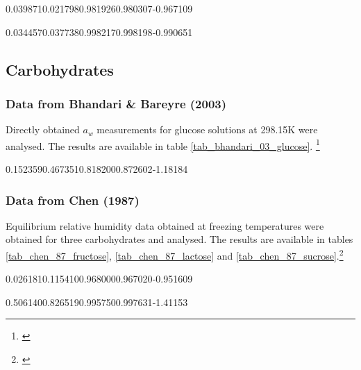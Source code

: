 %
	{0.039871}{0.021798}{0.981926}{0.980307}{-0.967109}

%
	{0.034457}{0.037738}{0.998217}{0.998198}{-0.990651}


\FloatBarrier

\subsection{Carbohydrates}

\subsubsection{Data from Bhandari \& Bareyre (2003)}

Directly obtained $a_w$ measurements for glucose solutions at 298.15K were analysed.
The results are available in table \ref{tab_bhandari_03_glucose}.
\footnote{\cite{bhandari2003}}

%
	{0.152359}{0.467351}{0.818200}{0.872602}{-1.18184}


\FloatBarrier

\subsubsection{Data from Chen (1987)}

Equilibrium relative humidity data obtained at freezing temperatures were obtained
for three carbohydrates and analysed. The results are available in tables
\ref{tab_chen_87_fructose}, \ref{tab_chen_87_lactose} and
\ref{tab_chen_87_sucrose}.\footnote{\cite{chen1987}}


%
	{0.026181}{0.115410}{0.968000}{0.967020}{-0.951609}

%
	{0.506140}{0.826519}{0.995750}{0.997631}{-1.41153}

